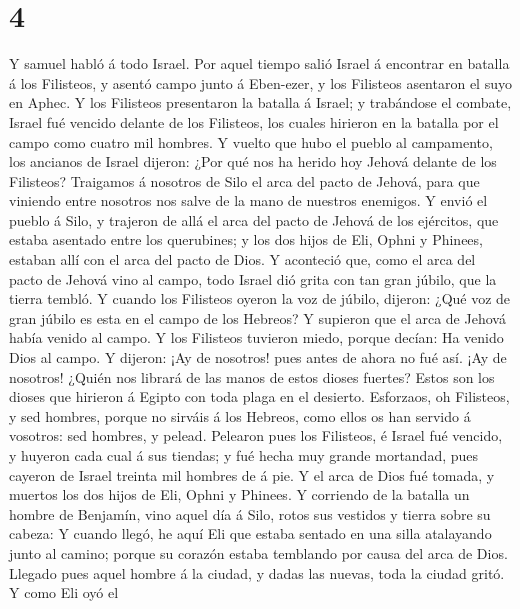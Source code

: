 \hypertarget{section-3}{%
\section{4}\label{section-3}}

 Y samuel habló á todo Israel. Por aquel tiempo salió Israel
á encontrar en batalla á los Filisteos, y asentó campo junto á
Eben-ezer, y los Filisteos asentaron el suyo en Aphec.  Y
los Filisteos presentaron la batalla á Israel; y trabándose el combate,
Israel fué vencido delante de los Filisteos, los cuales hirieron en la
batalla por el campo como cuatro mil hombres.  Y vuelto que
hubo el pueblo al campamento, los ancianos de Israel dijeron: ¿Por qué
nos ha herido hoy Jehová delante de los Filisteos? Traigamos á nosotros
de Silo el arca del pacto de Jehová, para que viniendo entre nosotros
nos salve de la mano de nuestros enemigos.  Y envió el
pueblo á Silo, y trajeron de allá el arca del pacto de Jehová de los
ejércitos, que estaba asentado entre los querubines; y los dos hijos de
Eli, Ophni y Phinees, estaban allí con el arca del pacto de Dios.
 Y aconteció que, como el arca del pacto de Jehová vino al
campo, todo Israel dió grita con tan gran júbilo, que la tierra tembló.
 Y cuando los Filisteos oyeron la voz de júbilo, dijeron:
¿Qué voz de gran júbilo es esta en el campo de los Hebreos? Y supieron
que el arca de Jehová había venido al campo.  Y los
Filisteos tuvieron miedo, porque decían: Ha venido Dios al campo. Y
dijeron: ¡Ay de nosotros! pues antes de ahora no fué así. 
¡Ay de nosotros! ¿Quién nos librará de las manos de estos dioses
fuertes? Estos son los dioses que hirieron á Egipto con toda plaga en el
desierto.  Esforzaos, oh Filisteos, y sed hombres, porque no
sirváis á los Hebreos, como ellos os han servido á vosotros: sed
hombres, y pelead.  Pelearon pues los Filisteos, é Israel
fué vencido, y huyeron cada cual á sus tiendas; y fué hecha muy grande
mortandad, pues cayeron de Israel treinta mil hombres de á pie.
 Y el arca de Dios fué tomada, y muertos los dos hijos de
Eli, Ophni y Phinees.  Y corriendo de la batalla un hombre
de Benjamín, vino aquel día á Silo, rotos sus vestidos y tierra sobre su
cabeza:  Y cuando llegó, he aquí Eli que estaba sentado en
una silla atalayando junto al camino; porque su corazón estaba temblando
por causa del arca de Dios. Llegado pues aquel hombre á la ciudad, y
dadas las nuevas, toda la ciudad gritó.  Y como Eli oyó el

